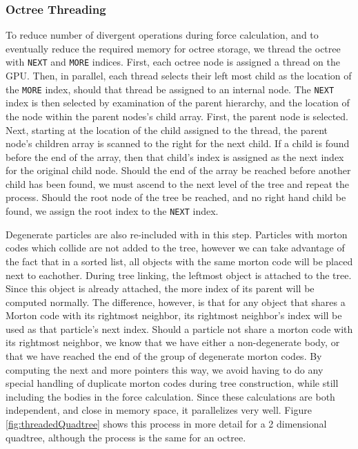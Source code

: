 \documentclass{thesis}
\begin{document}
\subsubsection{Octree Threading}
To reduce number of divergent operations during force calculation, and to eventually reduce the required memory for octree storage, we thread the octree with \verb|NEXT| and \verb|MORE| indices. First, each octree node is assigned a thread on the GPU. Then, in parallel, each thread selects their left most child as the location of the \verb|MORE| index, should that thread be assigned to an internal node. The \verb|NEXT| index is then selected by examination of the parent hierarchy, and the location of the node within the parent nodes's child array. First, the parent node is selected. Next, starting at the location of the child assigned to the thread, the parent node's children array is scanned to the right for the next child. If a child is found before the end of the array, then that child's index is assigned as the next index for the original child node. Should the end of the array be reached before another child has been found, we must ascend to the next level of the tree and repeat the process. Should the root node of the tree be reached, and no right hand child be found, we assign the root index to the \verb|NEXT| index.

Degenerate particles are also re-included with in this step. Particles with morton codes which collide are not added to the tree, however we can take advantage of the fact that in a sorted list, all objects with the same morton code will be placed next to eachother. During tree linking, the leftmost object is attached to the tree. Since this object is already attached, the more index of its parent will be computed normally. The difference, however, is that for any object that shares a Morton code with its rightmost neighbor, its rightmost neighbor's index will be used as that particle's next index. Should a particle not share a morton code with its rightmost neighbor, we know that we have either a non-degenerate body, or that we have reached the end of the group of degenerate morton codes. By computing the next and more pointers this way, we avoid having to do any special handling of duplicate morton codes during tree construction, while still including the bodies in the force calculation. Since these calculations are both independent, and close in memory space, it parallelizes very well. Figure \ref{fig:threadedQuadtree} shows this process in more detail for a 2 dimensional quadtree, although the process is the same for an octree.
\end{document}
